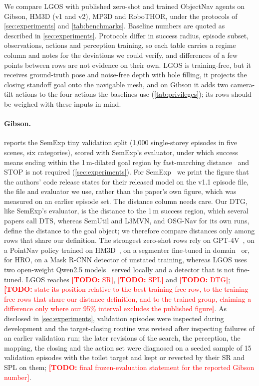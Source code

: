 \documentclass[10pt]{article}
\newcommand{\TODO}[1]{\textcolor{red}{\textbf{[TODO:} #1\textbf{]}}}
\newcommand{\ours}{LGOS\xspace}
\newcommand{\SR}{\textsc{SR}\xspace}
\newcommand{\SPL}{\textsc{SPL}\xspace}
\newcommand{\DTG}{\textsc{DTG}\xspace}
\begin{document}
We compare \ours with published zero-shot and trained ObjectNav agents on Gibson, HM3D (v1 and v2), MP3D and
RoboTHOR, under the protocols of \cref{sec:experiments} and \cref{tab:benchmarks}. Baseline numbers are quoted as
described in \cref{sec:experiments}. Protocols differ in success radius, episode subset,
observations, actions and perception training, so each table carries a regime column and notes for the deviations we
could verify, and differences of a few points between rows are not evidence on their own. \ours is training-free, but
it receives ground-truth pose and noise-free depth with hole filling, it projects the closing standoff goal onto
the navigable mesh, and on Gibson it adds two camera-tilt actions to the four actions the baselines use
(\cref{tab:privileges}); its rows should be weighed with these inputs in mind.

\paragraph{Gibson.}
 reports the SemExp tiny validation split (1{,}000 single-storey episodes in five scenes, six
categories), scored with SemExp's evaluator, under which success means ending within the 1\,m-dilated goal region
by fast-marching distance~\citep{sethian1996fast} and STOP is not required (\cref{sec:experiments}). For
SemExp~\citep{chaplot2020object} we print the figure that the authors' code release states for their released model
on the v1.1 episode file, the file and evaluator we use, rather than the paper's own figure, which was measured on an
earlier episode set. The distance column needs care. Our \DTG, like SemExp's evaluator, is the distance to the 1\,m
success region, which several papers call DTS, whereas SemUtil and L3MVN, and OSG-Nav for its own runs, define the
distance to the goal object; we therefore compare distances only among rows that share our definition. The strongest
zero-shot rows rely on GPT-4V~\citep{yuan2024gamap}, on a PointNav policy trained on HM3D~\citep{yokoyama2024vlfm},
on a segmenter fine-tuned in domain~\citep{zhang2024trihelper} or, for HRO, on a Mask R-CNN detector of unstated
training, whereas \ours uses two open-weight Qwen2.5
models~\citep{yang2024qwen25} served locally and a detector that is not fine-tuned. \ours reaches \TODO{SR},
\TODO{SPL} and \TODO{DTG}; \TODO{state its position relative to the best training-free row, to the training-free
rows that share our distance definition, and to the trained group, claiming a difference only where our 95\%
interval excludes the published figure}. As disclosed in \cref{sec:experiments}, validation episodes were inspected
during development and the target-closing routine was revised after inspecting failures of an earlier validation run;
the later revisions of the search, the perception, the mapping, the closing and the action set were diagnosed on a seeded sample of 15
validation episodes with the toilet target and kept or reverted by their \SR and \SPL on them; \TODO{final frozen-evaluation statement for the reported Gibson
number}.
\end{document}
